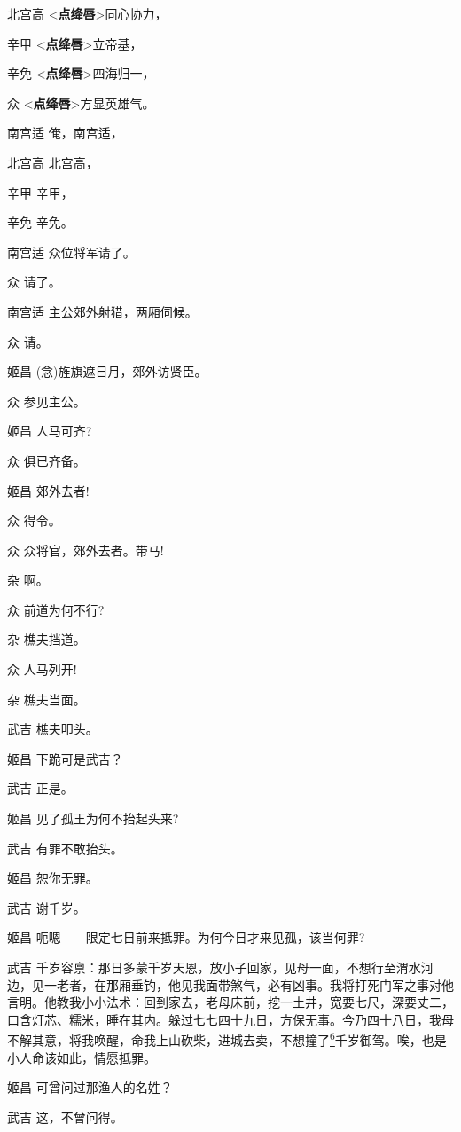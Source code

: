北宫高 \textless{}\textbf{点绛唇}\textgreater{}同心协力，

辛甲 \textless{}\textbf{点绛唇}\textgreater{}立帝基，

辛免 \textless{}\textbf{点绛唇}\textgreater{}四海归一，

众 \textless{}\textbf{点绛唇}\textgreater{}方显英雄气。

南宫适 俺，南宫适，

北宫高 北宫高，

辛甲 辛甲，

辛免 辛免。

南宫适 众位将军请了。

众 请了。

南宫适 主公郊外射猎，两厢伺候。

众 请。

姬昌 (念)旌旗遮日月，郊外访贤臣。

众 参见主公。

姬昌 人马可齐?

众 俱已齐备。

姬昌 郊外去者!

众 得令。

众 众将官，郊外去者。带马!

杂 啊。

众 前道为何不行?

杂 樵夫挡道。

众 人马列开!

杂 樵夫当面。

武吉 樵夫叩头。

姬昌 下跪可是武吉？

武吉 正是。

姬昌 见了孤王为何不抬起头来?

武吉 有罪不敢抬头。

姬昌 恕你无罪。

武吉 谢千岁。

姬昌 呃嗯------限定七日前来抵罪。为何今日才来见孤，该当何罪?

武吉
千岁容禀：那日多蒙千岁天恩，放小子回家，见母一面，不想行至渭水河边，见一老者，在那厢垂钓，他见我面带煞气，必有凶事。我将打死门军之事对他言明。他教我小小法术：回到家去，老母床前，挖一土井，宽要七尺，深要丈二，口含灯芯、糯米，睡在其内。躲过七七四十九日，方保无事。今乃四十八日，我母不解其意，将我唤醒，命我上山砍柴，进城去卖，不想撞了\protect\hyperlink{fn6}{\textsuperscript{6}}千岁御驾。唉，也是小人命该如此，情愿抵罪。

姬昌 可曾问过那渔人的名姓？

武吉 这，不曾问得。

